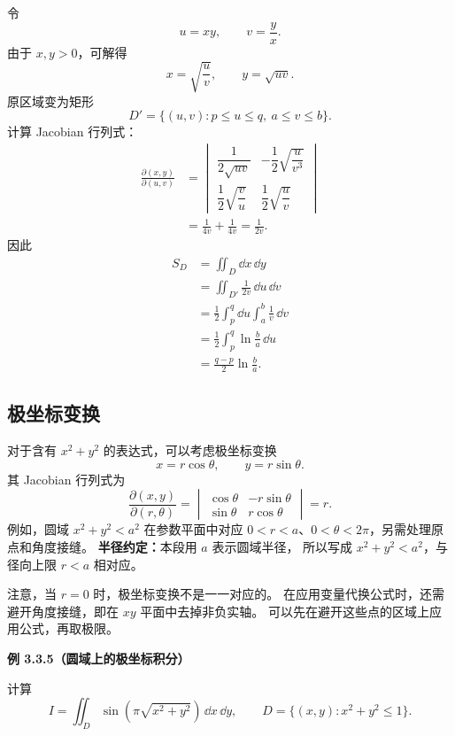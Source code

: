 令
\[
u=xy,\qquad v=\frac yx.
\]
由于 $x,y>0$，可解得
\[
x=\sqrt{\frac uv},\qquad y=\sqrt{uv}.
\]
原区域变为矩形
\[
D'=\{(u,v):p\le u\le q,\ a\le v\le b\}.
\]
计算 Jacobian 行列式：
\[
\begin{aligned}
\frac{\partial(x,y)}{\partial(u,v)}
&=\begin{vmatrix}
\dfrac1{2\sqrt{uv}}&-\dfrac12\sqrt{\dfrac u{v^3}}\\[7pt]
\dfrac12\sqrt{\dfrac vu}&\dfrac12\sqrt{\dfrac uv}
\end{vmatrix}\\
&=\frac1{4v}+\frac1{4v}
=\frac1{2v}.
\end{aligned}
\]
因此
\[
\begin{aligned}
S_D
&=\iint_D\dd x\,\dd y\\
&=\iint_{D'}\frac1{2v}\,\dd u\,\dd v\\
&=\frac12\int_p^q\dd u\int_a^b\frac1v\,\dd v\\
&=\frac12\int_p^q\ln\frac ba\,\dd u\\
&=\frac{q-p}{2}\ln\frac ba.
\end{aligned}
\]





\subsection*{极坐标变换}

对于含有 $x^2+y^2$ 的表达式，可以考虑极坐标变换
\[
x=r\cos\theta,\qquad y=r\sin\theta.
\]
其 Jacobian 行列式为
\[
\frac{\partial(x,y)}{\partial(r,\theta)}
=\begin{vmatrix}
\cos\theta&-r\sin\theta\\
\sin\theta&r\cos\theta
\end{vmatrix}
=r.
\]
例如，圆域 $x^2+y^2<a^2$ 在参数平面中对应
$0<r<a$、$0<\theta<2\pi$，另需处理原点和角度接缝。
\textbf{半径约定：}本段用 $a$ 表示圆域半径，
所以写成 $x^2+y^2<a^2$，与径向上限 $r<a$ 相对应。

注意，当 $r=0$ 时，极坐标变换不是一一对应的。
在应用变量代换公式时，还需避开角度接缝，即在 $xy$ 平面中去掉非负实轴。
可以先在避开这些点的区域上应用公式，再取极限。



\textbf{例 3.3.5（圆域上的极坐标积分）}


计算
\[
I=\iint_D\sin\!\left(\pi\sqrt{x^2+y^2}\right)\,\dd x\,\dd y,
\qquad
D=\{(x,y):x^2+y^2\le1\}.
\]





